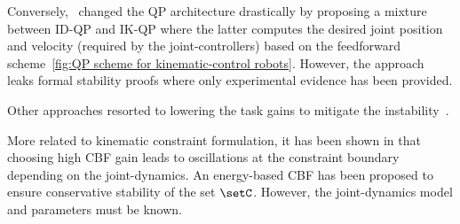  Conversely,~\cite{feng2014humanoids,feng2015journalOfFieldRobotics} changed the QP architecture drastically by proposing a mixture between ID-QP and IK-QP where the latter computes the desired joint position and velocity (required by the joint-controllers) based on the feedforward scheme~\cref{fig:QP scheme for kinematic-control robots}. However, the approach leaks formal stability proofs where only experimental evidence has been provided. 

Other approaches resorted to lowering the task gains to mitigate the instability~\cite{koolen2016ijhr,johnson2015journalOfFieldRobotics}. 

More related to kinematic constraint formulation, it has been shown in \cite{singletary2022csl,molnar2022ral} that choosing high CBF gain leads to oscillations at the constraint boundary depending on the joint-dynamics. An energy-based CBF has been proposed to ensure conservative stability of the set $\setC$. However, the joint-dynamics model and parameters must be known. 

 
